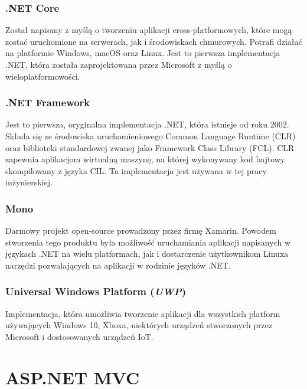 \subsection{.NET Core}
Został napisany z myślą o tworzeniu aplikacji cross-platformowych, które mogą zostać uruchomione na serwerach, jak i środowiskach chmurowych. Potrafi działać na platformie Windows, macOS oraz Linux. Jest to pierwsza implementacja .NET, która została zaprojektowana przez Microsoft z myślą o wieloplatformowości.

\subsection{.NET Framework}
Jest to pierwsza, oryginalna implementacja .NET, która istnieje od roku 2002. Składa się ze środowiska uruchomieniowego Common Language Runtime (CLR) oraz biblioteki standardowej zwanej jako Framework Class Library (FCL). CLR zapewnia aplikacjom wirtualną maszynę, na której wykonywany kod bajtowy skompilowany z języka CIL. Ta implementacja jest używana w tej pracy inżynierskiej.

\subsection{Mono}
Darmowy projekt open-source prowadzony przez firmę Xamarin. Powodem stworzenia tego produktu była możliwość uruchamiania aplikacji napisanych w językach .NET na wielu platformach, jak i dostarczenie użytkownikom Linuxa narzędzi pozwalających na aplikacji w rodzinie języków .NET.
\subsection{Universal Windows Platform (\textit{UWP})}
Implementacja, która umożliwia tworzenie aplikacji dla wszystkich platform używających Windows 10, Xboxa, niektórych urządzeń stworzonych przez Microsoft i dostosowanych urządzeń IoT.


\chapter{ASP.NET MVC}
\label{cha:wstep}

